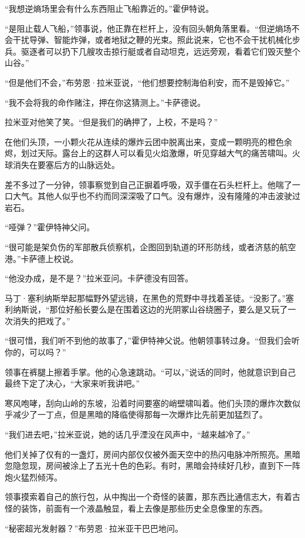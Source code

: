 \documentclass[AutoFakeBold=true]{book}
\begin{document}
``我想逆熵场里会有什么东西阻止飞船靠近的。''霍伊特说。

``是阻止{\kaishu 载人}飞船，''领事说，他正靠在栏杆上，没有回头朝角落里看。``但逆熵场不会干扰导弹、智能炸弹，或者地狱之鞭的光束。照此说来，它也不会干扰机械化步兵。驱逐者可以扔下几艘攻击掠行艇或者自动坦克，远远旁观，看着它们毁灭整个山谷。''

``但是他们不会，''布劳恩·拉米亚说，``他们想要控制海伯利安，而不是毁掉它。''

``我不会将我的命作赌注，押在你这猜测上。''卡萨德说。

拉米亚对他笑了笑。``但是我们的确押了，上校，不是吗？''

在他们头顶，一小颗火花从连续的爆炸云团中脱离出来，变成一颗明亮的橙色余烬，划过天际。露台上的这群人可以看见火焰激爆，听见穿越大气的痛苦啸叫。火球消失在要塞后方的山脉远处。

差不多过了一分钟，领事察觉到自己正摒着呼吸，双手僵在石头栏杆上。他喘了一口大气。其他人似乎也不约而同深深吸了口气。没有爆炸，没有隆隆的冲击波驶过岩石。

``哑弹？''霍伊特神父问。

``很可能是架负伤的军部散兵侦察机，企图回到轨道的环形防线，或者济慈的航空港。''卡萨德上校说。

``他没办成，是不是？''拉米亚问。卡萨德没有回答。

马丁·塞利纳斯举起那幅野外望远镜，在黑色的荒野中寻找着圣徒。``没影了。''塞利纳斯说，``那位好船长要么是在围着这边的光阴冢山谷绕圈子，要么是又玩了一次消失的把戏了。''

``很可惜，我们听不到他的故事了，''霍伊特神父说。他朝领事转过身。``但我们会听你的，可以吗？''

领事在裤腿上擦着手掌。他的心急速跳动。``可以，''说话的同时，他就意识到自己最终下定了决心，``大家来听我讲吧。''

寒风咆哮，刮向山岭的东坡，沿着时间要塞的峭壁啸叫着。他们头顶的爆炸次数似乎减少了一丁点，但是黑暗的降临使得那每一次爆炸比先前更加猛烈了。

``我们进去吧，''拉米亚说，她的话几乎湮没在风声中，``越来越冷了。''

他们关掉了仅有的一盏灯，房间内部仅仅被外面天空中的热闪电脉冲所照亮。黑暗忽隐忽现，房间被涂上了五光十色的色彩。有时，黑暗会持续好几秒，直到下一阵炮火猛烈倾泻。

领事摸索着自己的旅行包，从中掏出一个奇怪的装置，那东西比通信志大，有着古怪的装饰，前面有一个液晶触显，看上去像是那些历史全息像里的东西。

``秘密超光发射器？''布劳恩·拉米亚干巴巴地问。
\end{document}
